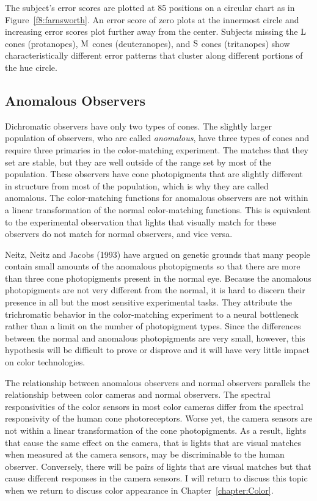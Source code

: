 The subject's error scores are plotted at 85 positions
on a circular chart as in Figure~\ref{f8:farnsworth}.
An error score of zero plots at the innermost circle
and increasing error scores plot further away from the center.
Subjects missing the $\mbox{L}$ cones (protanopes),
$\mbox{M}$ cones (deuteranopes), and $\mbox{S}$ cones (tritanopes)
show characteristically different error patterns
that cluster along different portions of the hue circle.

\subsection*{Anomalous Observers}
Dichromatic observers have only two types of cones.
The slightly larger population of observers,
who are called {\em anomalous},
have three types of cones and require three primaries
in the color-matching experiment.
The matches that they set are stable,
but they are well outside of the range
set by most of the population.
These observers have cone photopigments
that are slightly different in structure from
most of the population, which is why they are
called anomalous.
The color-matching functions for anomalous observers are
not within a linear transformation of the  normal color-matching functions.
This is equivalent to the experimental observation that
lights that visually match for these observers do
not match for normal observers, and vice versa.

Neitz, Neitz and Jacobs (1993) have argued on genetic
grounds that many people contain small amounts of the 
anomalous photopigments
so that there are more than three cone photopigments present 
in the normal eye.
Because the anomalous photopigments are not very different
from the normal, it is hard to discern their presence
in all but the most sensitive experimental tasks.
They attribute the trichromatic behavior in the color-matching
experiment to a neural bottleneck rather than 
a limit on the number of photopigment types.
Since the differences between the normal and anomalous photopigments
are very small, however, this hypothesis will be difficult
to prove or disprove and it will have very little impact
on color technologies.

The relationship between anomalous observers and
normal observers parallels the relationship
between color cameras and normal observers.
The spectral responsivities of the
color sensors in most color cameras
differ from the spectral responsivity of the human
cone photoreceptors.
Worse yet, the camera sensors are not within a
linear transformation of the cone photopigments.
As a result, lights that cause the same effect on the
camera, that is lights that are visual matches
when measured at the camera sensors,
may be discriminable to the human observer.
Conversely, there will be pairs of lights that are
visual matches but that cause different responses in
the camera sensors.
I will return to discuss this topic when we return
to discuss color appearance in Chapter~\ref{chapter:Color}.

